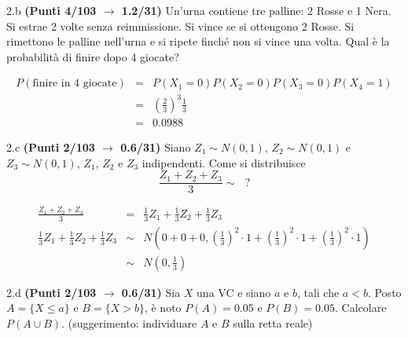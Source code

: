 \documentclass[
  11pt,
]{book}
\theoremstyle{mytheoremstyle}
\theoremstyle{mydefstyle}
\newenvironment{sol}
  {
  \begin{tcolorbox}[enhanced,breakable,arc=0.1mm,boxrule=1pt,colback=white,colframe=iblue,
  title=\bf \fontfamily{lmss}\selectfont \hspace{.5 cm} Soluzione,drop fuzzy shadow]

}{
\end{tcolorbox}
  }
\begin{document}
2.b \textbf{(Punti 4/103 \(\rightarrow\) 1.2/31)} Un'urna contiene tre palline: 2 Rosse e 1 Nera. Si estrae 2 volte senza reimmissione.
Si vince se si ottengono 2 Rosse. Si rimettono le palline nell'urna e si ripete finché non si vince una volta. Qual è la probabilità di finire dopo 4 giocate?

\begin{sol}
\begin{eqnarray*}
P(\text{finire in 4 giocate}) &=& P(X_1=0)P(X_2=0)P(X_3=0)P(X_4=1)\\
                              &=& \left(\frac 23\right)^3 \frac 13\\
                              &=& 0.0988
\end{eqnarray*}

\end{sol}

2.c \textbf{(Punti 2/103 \(\rightarrow\) 0.6/31)} Siano \(Z_1\sim N(0,1)\), \(Z_2\sim N(0,1)\) e \(Z_3\sim N(0,1)\), \(Z_1\), \(Z_2\) e \(Z_3\) indipendenti.
Come si distribuisce
\[
\frac{Z_1+Z_2+Z_3}{3}\sim ~~~?
\]

\begin{sol}
\begin{eqnarray*}
\frac{Z_1+Z_2+Z_3}{3}  &=& \frac 13 Z_1+\frac 13 Z_2 +\frac 13 Z_3\\
\frac 13 Z_1+\frac 13 Z_2 +\frac 13 Z_3 &\sim& N\left(0+0+0,\left(\frac 13\right)^2\cdot 1+\left(\frac 13\right)^2\cdot 1+\left(\frac 13\right)^2\cdot 1\right)\\
&\sim& N\left(0,\frac 13\right)
\end{eqnarray*}

\end{sol}

2.d \textbf{(Punti 2/103 \(\rightarrow\) 0.6/31)} Sia \(X\) una VC e siano \(a\) e \(b\), tali che \(a<b\). Posto \(A=\{X\le a\}\) e \(B=\{X > b\}\), è noto \(P(A)=0.05\) e \(P(B)=0.05\). Calcolare \(P(A\cup B)\). (suggerimento: individuare \(A\) e \(B\) sulla retta reale)
\end{document}
